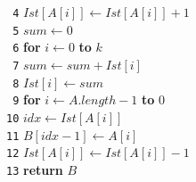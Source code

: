 \documentclass[10pt,landscape]{article}
\begin{document}
\begin{multicols*}{4}
                \verb| 4|\hspace*{1.5em} $Ist[A[i]] \leftarrow Ist[A[i]] + 1$\\
                \verb| 5|\hspace*{0.5em} $sum \leftarrow 0$\\
                \verb| 6|\hspace*{0.5em} \textbf{for} $i \leftarrow 0$ \textbf{to} $k$\\
                \verb| 7|\hspace*{1.5em} $sum \leftarrow sum + Ist[i]$\\
                \verb| 8|\hspace*{1.5em} $Ist[i] \leftarrow sum$\\
                \verb| 9|\hspace*{0.5em} \textbf{for} $i \leftarrow A.length - 1$ \textbf{to} $0$\\
                \verb|10|\hspace*{1.5em} $idx \leftarrow Ist[A[i]]$\\
                \verb|11|\hspace*{1.5em} $B[idx - 1] \leftarrow A[i]$\\
                \verb|12|\hspace*{1.5em} $Ist[A[i]] \leftarrow Ist[A[i]] - 1$\\
                \verb|13|\hspace*{0.5em} \textbf{return} $B$

\end{multicols*}
\end{document}
